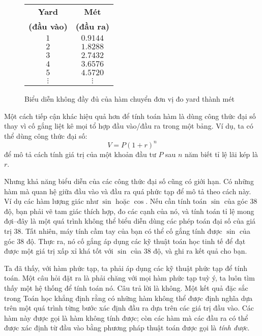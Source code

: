 \begin{figure}
\label{fig:fig111}
  \begin{center}
    \begin{tabular}{cc}
      \hline
      \textbf{Yard}      & \textbf{Mét}      \\
      \textbf{(đầu vào)} & \textbf{(đầu ra)} \\ \hline
      $1$                & $0.9144$          \\
      $2$                & $1.8288$          \\
      $3$                & $2.7432$          \\
      $4$                & $3.6576$          \\
      $5$                & $4.5720$          \\
      $\vdots$           & $\vdots$          \\
      \hline
    \end{tabular}
  \end{center}
\caption{Biểu diễn không đầy đủ của hàm chuyển đơn vị đo yard thành mét }
\end{figure}


Một cách tiếp cận khác hiệu quả hơn để tính toán hàm là dùng công thức đại số thay vì cố
gắng liệt kê mọi tổ hợp đầu vào/đầu ra trong một bảng. Ví dụ, ta có thể dùng công thức đại
số:
\[
V = P (1 + r)^n
\]
để mô tả cách tính giá trị của một khoản đầu tư $P$ sau $n$ năm biết tỉ lệ lãi kép là $r$.

Nhưng khả năng biểu diễn của các công thức đại số cũng có giới hạn. Có những hàm mà quan
hệ giữa đầu vào và đầu ra quá phức tạp để mô tả theo cách này. Ví dụ các hàm lượng giác
như $\sin$ hoặc $\cos$. Nếu cần tính toán $\sin$ của góc $38$ độ, bạn phải vẽ tam giác
thích hợp, đo các cạnh của nó, và tính toán tỉ lệ mong đợi--đây là một quá trình không thể
biểu diễn dùng các phép toán đại số của giá trị $38$. Tất nhiên, máy tính cầm tay của bạn
có thể cố gắng tính được $\sin$ của góc $38$ độ. Thực ra, nó cố gắng áp dụng các kỹ thuật
toán học tinh tế để đạt được một giá trị xấp xỉ khá tốt với $\sin$ của $38$ độ, và ghi ra
kết quả cho bạn.

Ta đã thấy, với hàm phức tạp, ta phải áp dụng các kỹ thuật phức tạp để tính toán. Một câu
hỏi đặt ra là phải chăng với mọi hàm phức tạp tuỳ ý, ta luôn tìm thấy một hệ thống để tính
toán nó. Câu trả lời là không. Một kết quả đặc sắc trong Toán học khẳng định rằng có những
hàm không thể được định nghĩa dựa trên một quá trình từng bước xác định đầu ra dựa trên
các giá trị đầu vào. Các hàm này được gọi là hàm không tính được; còn các hàm mà các đầu
ra có thể được xác định từ đầu vào bằng phương pháp thuật toán được gọi là \textit{tính
  được}.


